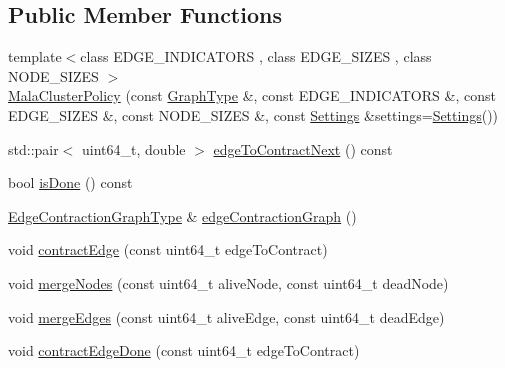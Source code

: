 \subsection*{Public Member Functions}
\begin{DoxyCompactItemize}
\item 
{\footnotesize template$<$class E\+D\+G\+E\+\_\+\+I\+N\+D\+I\+C\+A\+T\+O\+R\+S , class E\+D\+G\+E\+\_\+\+S\+I\+Z\+E\+S , class N\+O\+D\+E\+\_\+\+S\+I\+Z\+E\+S $>$ }\\\hyperlink{classnifty_1_1graph_1_1agglo_1_1MalaClusterPolicy_a2d238839c2d3afb3c0dac93ec5a00ceb}{Mala\+Cluster\+Policy} (const \hyperlink{classnifty_1_1graph_1_1agglo_1_1MalaClusterPolicy_ae2696b85f3f04787282e003bead20a5d}{Graph\+Type} \&, const E\+D\+G\+E\+\_\+\+I\+N\+D\+I\+C\+A\+T\+O\+R\+S \&, const E\+D\+G\+E\+\_\+\+S\+I\+Z\+E\+S \&, const N\+O\+D\+E\+\_\+\+S\+I\+Z\+E\+S \&, const \hyperlink{structnifty_1_1graph_1_1agglo_1_1MalaClusterPolicy_1_1Settings}{Settings} \&settings=\hyperlink{structnifty_1_1graph_1_1agglo_1_1MalaClusterPolicy_1_1Settings}{Settings}())
\item 
std\+::pair$<$ uint64\+\_\+t, double $>$ \hyperlink{classnifty_1_1graph_1_1agglo_1_1MalaClusterPolicy_a4ca63d2eb3a592e0f5b13ad29ef2e8c8}{edge\+To\+Contract\+Next} () const 
\item 
bool \hyperlink{classnifty_1_1graph_1_1agglo_1_1MalaClusterPolicy_abdd3019e33491993887de4cd534ca2af}{is\+Done} () const 
\item 
\hyperlink{classnifty_1_1graph_1_1agglo_1_1MalaClusterPolicy_a77a5b41304b53955aafbf214e2ad356f}{Edge\+Contraction\+Graph\+Type} \& \hyperlink{classnifty_1_1graph_1_1agglo_1_1MalaClusterPolicy_a77f322e55d36b39340ced1233b7e5852}{edge\+Contraction\+Graph} ()
\item 
void \hyperlink{classnifty_1_1graph_1_1agglo_1_1MalaClusterPolicy_a7001dcc73b1f93bcf5f2cbd1fa540dd8}{contract\+Edge} (const uint64\+\_\+t edge\+To\+Contract)
\item 
void \hyperlink{classnifty_1_1graph_1_1agglo_1_1MalaClusterPolicy_abd796017f547240be8ea4c3945a545f0}{merge\+Nodes} (const uint64\+\_\+t alive\+Node, const uint64\+\_\+t dead\+Node)
\item 
void \hyperlink{classnifty_1_1graph_1_1agglo_1_1MalaClusterPolicy_a0e6988bea57746b1395837cb0fedc10c}{merge\+Edges} (const uint64\+\_\+t alive\+Edge, const uint64\+\_\+t dead\+Edge)
\item 
void \hyperlink{classnifty_1_1graph_1_1agglo_1_1MalaClusterPolicy_a14238cc6529f3a585aef89c6a99407a1}{contract\+Edge\+Done} (const uint64\+\_\+t edge\+To\+Contract)
\end{DoxyCompactItemize}
